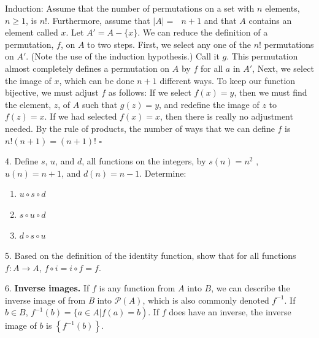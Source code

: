 \documentclass[10pt,]{book}
\newcommand{\terminology}[1]{\textbf{#1}}
\theoremstyle{plain}
\theoremstyle{definition}
\theoremstyle{definition}
\theoremstyle{definition}
\begin{document}
\begin{exercisegroup}
\begin{enumerate}[label=\alph*]
\par
Induction: Assume that the number of permutations on a set with \(n\) elements,
 \(n\geq 1\), is \(n\)!. Furthermore, assume that \(|A|=\)\(\text{  }n+1\) and that \(A\) contains
  an element called \(x\). Let \(A'=A-\{x\}\). We can reduce the definition of a permutation, \(f\),
   on \(A\) to two steps. First, we select any one of the \(n\)! permutations on \(A'\).
    (Note the use of the induction hypothesis.) Call it \(g\). This permutation almost
     completely defines a permutation on \(A\) by \(f\) for all
      \(a\) in \(A'\), Next, we select the image of \(x\), which can be done \(n+1\) different ways.
       To keep our function bijective, we must adjust \(f\) as follows: If we select \(f(x)=y\),
        then we must find the element, \(z\), of \(A\) such that \(g(z)=y\), and redefine the image
         of \(z\) to \(f(z)=x\). If we had selected \(f(x)=x\), then there is really no adjustment needed.
          By the rule of products, the number of ways that we can define \(f\) is \(n!(n+1)=(n+1)!\) \(\square\)%
\end{enumerate}
%
\item[4.]\hypertarget{exercise-26}{} Define \(s\), \(u\), and \(d\), all functions on the integers, by \(s(n) = n^2\) , \(u(n) = n + 1\), and \(d(n) = n-1\). Determine:%
\par
\leavevmode%
\begin{enumerate}[label=\alph*]
\item\hypertarget{li-87}{} \(u \circ  s \circ  d\)%
\item\hypertarget{li-88}{} \(s \circ  u\circ  d\)%
\item\hypertarget{li-89}{} \(d \circ  s \circ  u\)%
\end{enumerate}
%
\par\smallskip
\item[5.]\hypertarget{exercise-27}{} Based on the definition of the identity function, show that for all functions \(f:A\to A\), \(f\circ i=i\circ f = f\).%
\par\smallskip
\item[6.]\hypertarget{exercise-28}{}\terminology{Inverse images.} If \(f\) is any function from \(A\) into \(B\), we can describe the inverse image of from \textit{
B }into \(\mathcal{P}(A)\), which is also commonly denoted \(f^{-1}\). If \(b \in  B\), \(\left.f^{-1}(b) = \{a \in A | f(a) = b\right)\). If
\(f\) does have an inverse, the inverse image of \(b\) is \(\left\{f^{-1}(b)\right\}\).%
\par

\end{exercisegroup}
\end{document}
